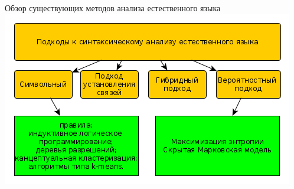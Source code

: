 \documentclass[10pt,ps,serif,mathserif]{beamer}
\begin{document}
    \begin{frame}{Обзор существующих методов анализа естественного языка}
        \includegraphics[width=\textwidth]{images/syntax_analysis_metods.png}
    \end{frame}
\end{document}
